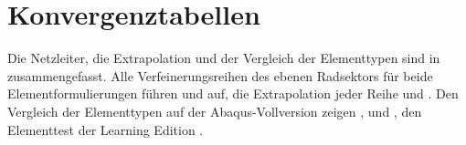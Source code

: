 \section{Konvergenztabellen}
\label{sec:anhang_e}

Die Netzleiter, die Extrapolation und der Vergleich der Elementtypen sind in  zusammengefasst. Alle Verfeinerungsreihen des ebenen Radsektors für beide Elementformulierungen führen  und  auf, die Extrapolation jeder Reihe  und . Den Vergleich der Elementtypen auf der Abaqus-Vollversion zeigen ,  und , den Elementtest der Learning Edition .









